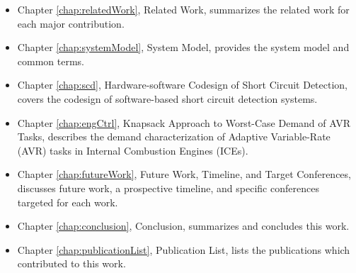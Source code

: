 \begin{itemize}
    \item Chapter \ref{chap:relatedWork}, Related Work, summarizes the related work for each major contribution.
    \item Chapter \ref{chap:systemModel}, System Model, provides the system model and common terms.
    \item Chapter \ref{chap:scd}, Hardware-software Codesign of Short Circuit Detection, covers the codesign of software-based short circuit detection systems.
    \item Chapter \ref{chap:engCtrl}, Knapsack Approach to Worst-Case Demand of AVR Tasks, describes the demand characterization of Adaptive Variable-Rate (AVR) tasks in Internal Combustion Engines (ICEs).
    \item Chapter \ref{chap:futureWork}, Future Work, Timeline, and Target Conferences, discusses future work, a prospective timeline, and specific conferences targeted for each work.
    \item Chapter \ref{chap:conclusion}, Conclusion, summarizes and concludes this work.
    \item Chapter \ref{chap:publicationList}, Publication List, lists the publications which contributed to this work.
\end{itemize}